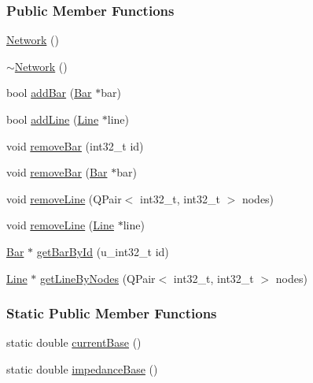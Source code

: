 \subsubsection*{Public Member Functions}
\begin{DoxyCompactItemize}
\item 
\hyperlink{group___graphics_ga3cc2fb4f8fa4d507077e8da85ce5a1c8}{Network} ()
\item 
\hyperlink{group___graphics_ga7a4e19cdb4bf0c7ecf82baa643831492}{$\sim$\+Network} ()
\item 
bool \hyperlink{group___graphics_ga8c5dfef0216731246f7411e1a5fbee01}{add\+Bar} (\hyperlink{class_bar}{Bar} $\ast$bar)
\item 
bool \hyperlink{group___graphics_gae02945131494987b3ff9b59b627719b4}{add\+Line} (\hyperlink{class_line}{Line} $\ast$line)
\item 
void \hyperlink{group___graphics_ga997ce4f03d316b9f138f2e64e6ca400c}{remove\+Bar} (int32\+\_\+t id)
\item 
void \hyperlink{group___graphics_ga7dea7690987c58fa61ffaa0326b68b68}{remove\+Bar} (\hyperlink{class_bar}{Bar} $\ast$bar)
\item 
void \hyperlink{group___graphics_ga1eef3317224a7a06348fce07e581a9ad}{remove\+Line} (Q\+Pair$<$ int32\+\_\+t, int32\+\_\+t $>$ nodes)
\item 
void \hyperlink{group___graphics_ga4fd51288aa75614593977ce8aab9100f}{remove\+Line} (\hyperlink{class_line}{Line} $\ast$line)
\item 
\hyperlink{class_bar}{Bar} $\ast$ \hyperlink{group___graphics_ga9c5806f5a0d236bb6d8abbdce62d9675}{get\+Bar\+By\+Id} (u\+\_\+int32\+\_\+t id)
\item 
\hyperlink{class_line}{Line} $\ast$ \hyperlink{group___graphics_ga8f090b85a7779695cb9f05b6395b3044}{get\+Line\+By\+Nodes} (Q\+Pair$<$ int32\+\_\+t, int32\+\_\+t $>$ nodes)
\end{DoxyCompactItemize}
\subsubsection*{Static Public Member Functions}
\begin{DoxyCompactItemize}
\item 
static double \hyperlink{class_network_a8aa668b172d3706c8c9ac756d6e94d20}{current\+Base} ()
\item 
static double \hyperlink{class_network_a8e0229acc4a5d5ac6ffadb5dc64cc7aa}{impedance\+Base} ()
\end{DoxyCompactItemize}
